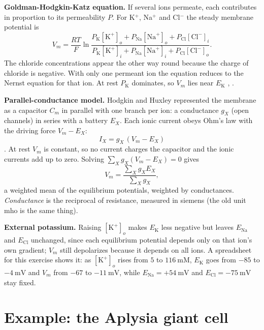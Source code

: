 \textbf{Goldman-Hodgkin-Katz equation.}
If several ions permeate, each
contributes in proportion to its
permeability $P$. For K$^+$, Na$^+$ and
Cl$^-$ the steady membrane potential is
\begin{equation}
\label{equation-ghk}
V_m = \frac{RT}{F}\ln
\frac{P_{\mathrm{K}}[\mathrm{K}^+]_o
+ P_{\mathrm{Na}}[\mathrm{Na}^+]_o
+ P_{\mathrm{Cl}}[\mathrm{Cl}^-]_i}
{P_{\mathrm{K}}[\mathrm{K}^+]_i
+ P_{\mathrm{Na}}[\mathrm{Na}^+]_i
+ P_{\mathrm{Cl}}[\mathrm{Cl}^-]_o}.
\end{equation}
The chloride concentrations appear the
other way round because the charge of
chloride is negative. With only one
permeant ion the equation reduces to the
Nernst equation for that ion. At rest
$P_{\mathrm{K}}$ dominates, so $V_m$ lies
near $E_{\mathrm{K}}$ \cite[Chapter
12]{hill2012animal}, \cite[Chapter
5]{randall1997eckert}.

\textbf{Parallel-conductance model.}
Hodgkin and Huxley represented the
membrane as a capacitor $C_m$ in parallel
with one branch per ion: a conductance
$g_X$ (open channels) in series with a
battery $E_X$. Each ionic current obeys
Ohm's law with the driving force
$V_m - E_X$:
\begin{equation}
\label{equation-ohm-ion}
I_X = g_X\,(V_m - E_X)
\end{equation}
\cite[Chapter 5]{randall1997eckert}. At
rest $V_m$ is constant, so no current
charges the capacitor and the ionic
currents add up to zero. Solving
$\sum_X g_X (V_m - E_X) = 0$ gives
\begin{equation}
\label{equation-parallel-conductance}
V_m = \frac{\sum_X g_X E_X}{\sum_X g_X},
\end{equation}
a weighted mean of the equilibrium
potentials, weighted by conductances.
\emph{Conductance} is the reciprocal of
resistance, measured in siemens (the old
unit mho is the same thing).

\textbf{External potassium.}
Raising $[\mathrm{K}^+]_o$ makes
$E_{\mathrm{K}}$ less negative but leaves
$E_{\mathrm{Na}}$ and $E_{\mathrm{Cl}}$
unchanged, since each equilibrium
potential depends only on that ion's own
gradient; $V_m$ still depolarizes because
it depends on all ions. A
spreadsheet for this exercise shows it:
as $[\mathrm{K}^+]_o$ rises from $5$ to
$116\ \mathrm{mM}$, $E_{\mathrm{K}}$ goes
from $-85$ to $-4\ \mathrm{mV}$ and $V_m$
from $-67$ to $-11\ \mathrm{mV}$, while
$E_{\mathrm{Na}} = +54\ \mathrm{mV}$ and
$E_{\mathrm{Cl}} = -75\ \mathrm{mV}$ stay
fixed.

\section{Example: the Aplysia giant cell}
\label{section-aplysia}

